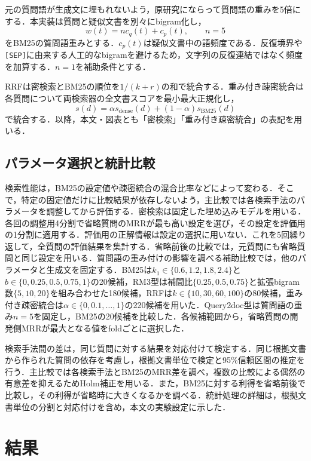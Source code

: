 \documentclass[twocolumn,a4paper,10pt]{ltjsarticle}
\begin{document}
元の質問語が生成文に埋もれないよう，原研究\cite{wang2023query2doc}にならって質問語の重みを5倍にする．本実装は質問と疑似文書を別々にbigram化し，
\begin{equation}
w(t)=n c_q(t)+c_p(t),\qquad n=5
\label{eq:qweight}
\end{equation}
をBM25の質問語重みとする．$c_p(t)$は疑似文書中の語頻度である．反復境界や\texttt{[SEP]}に由来する人工的なbigramを避けるため，文字列の反復連結ではなく頻度を加算する．$n=1$を補助条件とする．

RRFは密検索とBM25の順位を$1/(k+r)$の和で統合する．重み付き疎密統合は各質問について両検索器の全文書スコアを最小最大正規化し，
\begin{equation}
s(d)=\alpha s_{\mathrm{dense}}(d)+(1-\alpha)s_{\mathrm{BM25}}(d)
\end{equation}
で統合する．以降，本文・図表とも「密検索」「重み付き疎密統合」の表記を用いる．

\subsection{パラメータ選択と統計比較}
検索性能は，BM25の設定値や疎密統合の混合比率などによって変わる．そこで，特定の固定値だけに比較結果が依存しないよう，主比較では各検索手法のパラメータを調整してから評価する．密検索は固定した埋め込みモデルを用いる．
各回の調整用4分割で省略質問のMRRが最も高い設定を選び，その設定を評価用の1分割に適用する．評価用の正解情報は設定の選択に用いない．これを5回繰り返して，全質問の評価結果を集計する．省略前後の比較では，元質問にも省略質問と同じ設定を用いる．質問語の重み付けの影響を調べる補助比較では，他のパラメータと生成文を固定する．BM25は$k_1\in\{0.6,1.2,1.8,2.4\}$と$b\in\{0,0.25,0.5,0.75,1\}$の20候補，RM3型は補間比$\{0.25,0.5,0.75\}$と拡張bigram数$\{5,10,20\}$を組み合わせた180候補，RRFは$k\in\{10,30,60,100\}$の80候補，重み付き疎密統合は$\alpha\in\{0,0.1,\ldots,1\}$の220候補を用いた．Query2doc型は質問語の重み$n=5$を固定し，BM25の20候補を比較した．各候補範囲から，省略質問の開発側MRRが最大となる値をfoldごとに選択した．

検索手法間の差は，同じ質問に対する結果を対応付けて検定する．同じ根拠文書から作られた質問の依存を考慮し，根拠文書単位で検定と95\%信頼区間の推定を行う．主比較では各検索手法とBM25のMRR差を調べ，複数の比較による偶然の有意差を抑えるためHolm補正を用いる．また，BM25に対する利得を省略前後で比較し，その利得が省略時に大きくなるかを調べる．統計処理の詳細は，根拠文書単位の分割と対応付けを含め，本文の実験設定に示した．
\section{結果}
\end{document}
